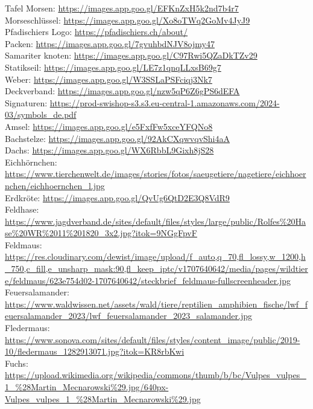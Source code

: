 Tafel Morsen: \url{https://images.app.goo.gl/EFKnZxH5k2nd7b4r7} \\
Morseschlüssel: \url{https://images.app.goo.gl/Xo8oTWq2GoMv4JyJ9} \\
Pfadischiers Logo: \url{https://pfadischiers.ch/about/} \\
Packen: \url{https://images.app.goo.gl/7gvuhbdNJV8ojmy47} \\
Samariter knoten: \url{https://images.app.goo.gl/C97Rwi5QZaDkTZv29} \\
Statikseil: \url{https://images.app.goo.gl/LE7z1qnqLLxsB69g7} \\
Weber: \url{https://images.app.goo.gl/W3SSLaPSFciqj3Nk7} \\
Deckverband: \url{https://images.app.goo.gl/nzw5qP6Z6gPS6dEFA} \\
Signaturen: \url{https://prod-swishop-s3.s3.eu-central-1.amazonaws.com/2024-03/symbols_de.pdf} \\
Amsel: \url{https://images.app.goo.gl/e5FxfFw5xceYFQNo8} \\
Bachstelze: \url{https://images.app.goo.gl/92AkCXqwvqvShi4aA} \\
Dachs: \url{https://images.app.goo.gl/WX6RbbL9Gixh8jS28} \\
Eichhörnchen: \url{https://www.tierchenwelt.de/images/stories/fotos/saeugetiere/nagetiere/eichhoernchen/eichhoernchen_l.jpg} \\
Erdkröte: \url{https://images.app.goo.gl/QvUg6QtD2E3Q8VdR9} \\
Feldhase: \url{https://www.jagdverband.de/sites/default/files/styles/large/public/Rolfes%20Hase%20WR%2011%201820_3x2.jpg?itok=9NGgFpvF} \\
Feldmaus: \url{https://res.cloudinary.com/dewist/image/upload/f_auto,q_70,fl_lossy,w_1200,h_750,c_fill,e_unsharp_mask:90,fl_keep_iptc/v1707640642/media/pages/wildtiere/feldmaus/623e754d02-1707640642/steckbrief_feldmaus-fullscreenheader.jpg} \\
Feuersalamander: \url{https://www.waldwissen.net/assets/wald/tiere/reptilien_amphibien_fische/lwf_feuersalamander_2023/lwf_feuersalamander_2023_salamander.jpg} \\
Fledermaus: \url{https://www.sonova.com/sites/default/files/styles/content_image/public/2019-10/fledermaus_1282913071.jpg?itok=KR8rbKwi} \\
Fuchs: \url{https://upload.wikimedia.org/wikipedia/commons/thumb/b/bc/Vulpes_vulpes_1_%28Martin_Mecnarowski%29.jpg/640px-Vulpes_vulpes_1_%28Martin_Mecnarowski%29.jpg} \\

